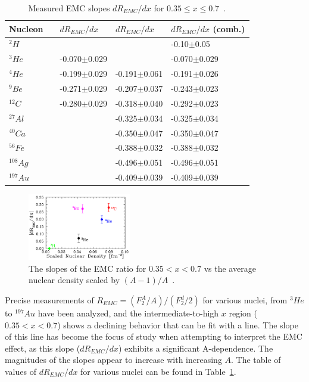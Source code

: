 \begin{table}
	\centering
	\setlength{\tabcolsep}{2em}
	\begin{tabular}{@{}lllll@{}}\toprule
		Nucleon & & $dR_{EMC}/dx$~\cite{Seely:2009gt} & $dR_{EMC}/dx$~\cite{Gomez:1993ri} & $dR_{EMC}/dx$ (comb.) \\ \midrule    
		$^2H$ & &                                      &                                   & -0.10$\pm$0.05~\cite{Griffioen:2015hxa} \\
		$^3He$ & & -0.070$\pm$0.029     &                                 & -0.070$\pm$0.029 \\
		$^4He$ & & -0.199$\pm$0.029        & -0.191$\pm$0.061   & -0.191$\pm$0.026 \\
		$^9Be$ & & -0.271$\pm$0.029         & -0.207$\pm$0.037  & -0.243$\pm$0.023 \\
		$^{12}C$ & & -0.280$\pm$0.029    & -0.318$\pm$0.040  & -0.292$\pm$0.023 \\
		$^{27}Al$ & &                                 & -0.325$\pm$0.034  & -0.325$\pm$0.034 \\
		$^{40}Ca$ & &                                 & -0.350$\pm$0.047 & -0.350$\pm$0.047 \\
		$^{56}Fe$ & &                                 & -0.388$\pm$0.032 & -0.388$\pm$0.032 \\
		$^{108}Ag$ & &                                 & -0.496$\pm$0.051 & -0.496$\pm$0.051 \\
		$^{197}Au$ & &                                 & -0.409$\pm$0.039 & -0.409$\pm$0.039 \\ \bottomrule        
	\end{tabular}
	\caption{Measured EMC slopes $dR_{EMC}/dx$ for $0.35\leq x \leq 0.7$~\cite{Piasetzky:2011zz}.}
	\label{tab:emc-slopes}
\end{table}

\begin{figure}
	\centering
	\includegraphics[width=0.4\textwidth]{figures/background/emc-vs-density.png}
	\caption{The slopes of the EMC ratio for $0.35<x<0.7$ vs the average nuclear density scaled by $(A-1)/A$~\cite{Seely:2009gt}.}
	\label{fig:emc-slope-vs-density}
\end{figure}
Precise measurements of $R_{EMC}=(F_2^A/A)/(F_2^d/2)$ for various nuclei, from $^3He$ to $^{197}Au$ have been analyzed, and the intermediate-to-high $x$ region ($0.35<x<0.7$) shows a declining behavior that can be fit with a line. The slope of this line has become the focus of study when attempting to interpret the EMC effect, as this slope ($dR_{EMC}/dx$) exhibits a significant A-dependence. The magnitudes of the slopes appear to increase with increasing $A$. The table of values of $dR_{EMC}/dx$ for various nuclei can be found in Table~\ref{tab:emc-slopes}.

